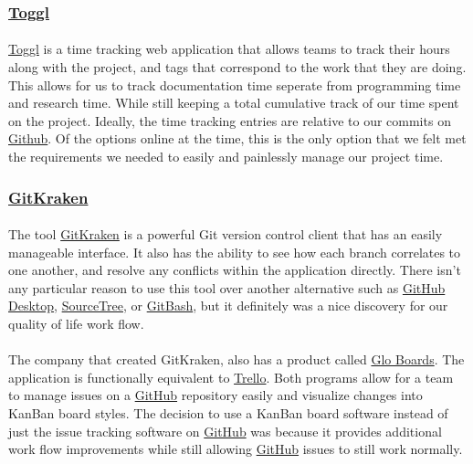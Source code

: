 \documentclass[12pt]{article}
\begin{document}
\subsubsection{\href{https://toggl.com}{Toggl}}
\paragraph{}	\href{https://toggl.com}{Toggl} is a time tracking web application that allows teams to track their hours along with the project, and tags that correspond to the work that they are doing. This allows for us to track documentation time seperate from programming time and research time. While still keeping a total cumulative track of our time spent on the project. Ideally, the time tracking entries are relative to our commits on \href{https://Github.com}{Github}. Of the options online at the time, this is the only option that we felt met the requirements we needed to easily and painlessly manage our project time.

\subsubsection{\href{https://www.gitkraken.com/}{GitKraken}}
\paragraph{}	The tool \href{https://www.gitkraken.com/}{GitKraken} is a powerful Git version control client that has an easily manageable interface. It also has the ability to see how each branch correlates to one another, and resolve any conflicts within the application directly. There isn't any particular reason to use this tool over another alternative such as \href{https://desktop.github.com/}{GitHub Desktop}, \href{https://www.sourcetreeapp.com/}{SourceTree}, or \href{https://gitforwindows.org/}{GitBash}, but it definitely was a nice discovery for our quality of life work flow. 

\paragraph{} The company that created GitKraken, also has a product called \href{https://www.gitkraken.com/glo}{Glo Boards}. The application is functionally equivalent to \href{https://trello.com/en}{Trello}. Both programs allow for a team to manage issues on a \href{https://github.com}{GitHub} repository easily and visualize changes into KanBan board styles. The decision to use a KanBan board software instead of just the issue tracking software on \href{https://github.com}{GitHub} was because it provides additional work flow improvements while still allowing \href{https://github.com}{GitHub} issues to still work normally.
\end{document}
